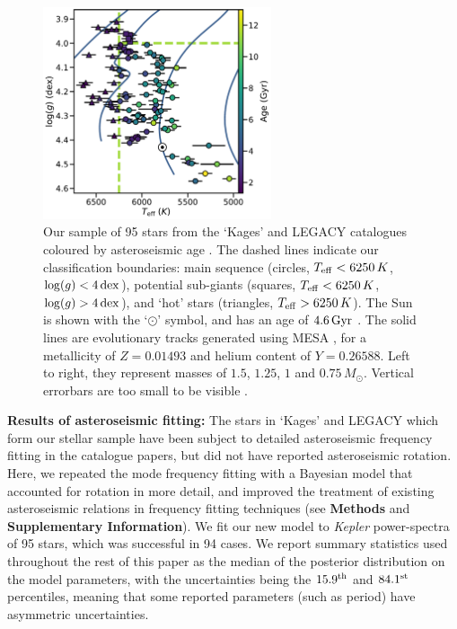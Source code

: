 \documentclass[12pt]{article}
\newcommand{\teff}{\mbox{$T_{\rm eff}$}\xspace}
\newcommand{\logg}{\mbox{$\log(g)$}\xspace}
\newcommand{\kepler}{\emph{Kepler}\xspace}
\begin{document}
\begin{figure}[h!]
	\centering
	\includegraphics[width=0.6\textwidth]{data.pdf}
	\caption{Our sample of 95 stars from the `Kages' and LEGACY catalogues coloured by asteroseismic age  \cite{silvaaguirre+2015, silvaaguirre+2017}. The dashed lines indicate our classification boundaries: main sequence (circles, $\teff < 6250\, K$, $\logg < 4\, \rm{dex}$), potential sub-giants (squares, $\teff < 6250\, K$, $\logg > 4\, \rm{dex}$), and `hot' stars (triangles, $\teff > 6250\, K$). The Sun is shown with the `$\odot$' symbol, and has an age of $4.6\, \rm{Gyr}$ \cite{bonanno+frohlich2015}. The solid lines are evolutionary tracks generated using MESA \cite{paxton+2017}, for a metallicity of $Z = 0.01493$ and helium content of $Y = 0.26588$. Left to right, they represent masses of $1.5$, $1.25$, $1$ and $0.75\, M_\odot$. Vertical errorbars are too small to be visible \cite{hunter2007}.}
	\label{fig:sample}
\end{figure}


\textbf{Results of asteroseismic fitting:} The stars in `Kages' and LEGACY which form our stellar sample have been subject to detailed asteroseismic frequency fitting in the catalogue papers, but did not have reported asteroseismic rotation. Here, we repeated the mode frequency fitting with a Bayesian model that accounted for rotation in more detail, and improved the treatment of existing asteroseismic relations in frequency fitting techniques (see \textbf{Methods} and \textbf{Supplementary Information}). We fit our new model to \kepler power-spectra of 95 stars, which was successful in 94 cases. We report summary statistics used throughout the rest of this paper as the median of the posterior distribution on the model parameters, with the uncertainties being the $15.9^{\rm th}$ and $84.1^{\rm st}$ percentiles, meaning that some reported parameters (such as period) have asymmetric uncertainties.
\end{document}

